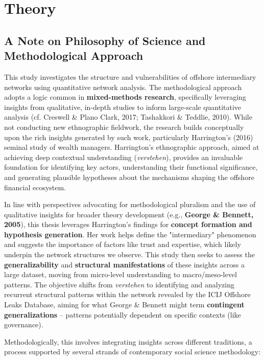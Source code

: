 \chapter{Theory}
\label{chap:theory}

\section{A Note on Philosophy of Science and Methodological Approach}
\label{sec:2_0}

This study investigates the structure and vulnerabilities of offshore intermediary networks using quantitative network analysis. The methodological approach adopts a logic common in \textbf{mixed-methods research}, specifically leveraging insights from qualitative, in-depth studies to inform large-scale quantitative analysis (cf. Creswell \& Plano Clark, 2017; Tashakkori \& Teddlie, 2010). While not conducting new ethnographic fieldwork, the research builds conceptually upon the rich insights generated by such work, particularly Harrington's (2016) seminal study of wealth managers. Harrington's ethnographic approach, aimed at achieving deep contextual understanding (\textit{verstehen}), provides an invaluable foundation for identifying key actors, understanding their functional significance, and generating plausible hypotheses about the mechanisms shaping the offshore financial ecosystem.

In line with perspectives advocating for methodological pluralism and the use of qualitative insights for broader theory development (e.g., \textbf{George \& Bennett, 2005}), this thesis leverages Harrington's findings for \textbf{concept formation and hypothesis generation}. Her work helps define the "intermediary" phenomenon and suggests the importance of factors like trust and expertise, which likely underpin the network structures we observe. This study then seeks to assess the \textbf{generalizability} and \textbf{structural manifestations} of these insights across a large dataset, moving from micro-level understanding to macro/meso-level patterns. The objective shifts from \textit{verstehen} to identifying and analyzing recurrent structural patterns within the network revealed by the ICIJ Offshore Leaks Database, aiming for what George \& Bennett might term \textbf{contingent generalizations} – patterns potentially dependent on specific contexts (like governance).

Methodologically, this involves integrating insights across different traditions, a process supported by several strands of contemporary social science methodology:

